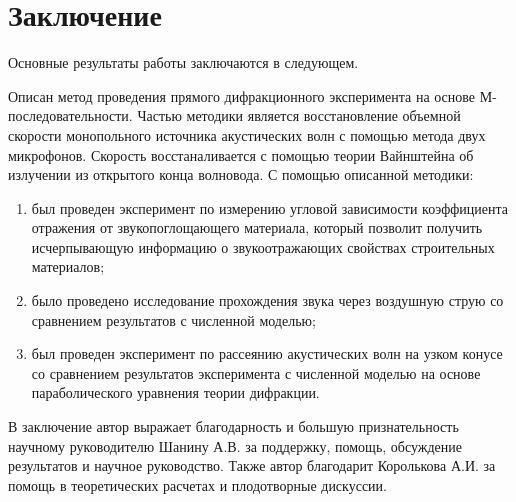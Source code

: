 \chapter*{Заключение}                       %


Основные результаты работы заключаются в следующем.

Описан метод проведения прямого дифракционного эксперимента на основе М-последовательности. Частью методики является восстановление объемной скорости монопольного источника акустических волн с помощью метода двух микрофонов. Скорость восстаналивается с помощью теории Вайнштейна об излучении из открытого конца волновода. С помощью описанной методики:
\begin{enumerate}
	\item был проведен эксперимент по измерению угловой зависимости коэффициента отражения от звукопоглощающего материала, который позволит получить исчерпывающую информацию о звукоотражающих свойствах строительных материалов;
	\item было проведено исследование прохождения звука через воздушную струю со сравнением результатов с численной моделью;
	\item был проведен эксперимент по рассеянию акустических волн на узком конусе со сравнением результатов эксперимента с численной моделью на основе параболического уравнения теории дифракции.
\end{enumerate}

В заключение автор выражает благодарность и большую признательность научному руководителю Шанину А.В. за поддержку, помощь, обсуждение результатов и научное руководство. Также автор благодарит Королькова А.И. за помощь в теоретических расчетах и плодотворные дискуссии.